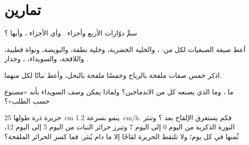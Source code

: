\section{تمارين}

\begin{exercise}[$\star$]\label{exo:b2:angiosperm-reproduction:1}
سمِّ دوّارات  الأربع وأجزاء  . وأي الأجزاء  ، وأيها  ؟
\end{exercise}

\begin{exercise}[$\star$]\label{exo:b2:angiosperm-reproduction:2}
أعط صيغة الصبغيات لكل من: ، والخلية الخضرية، وخلية نطفة،
والبويضة، ونواة قطبية، واللاقحة، والسويداء، ، وجدار
.
\end{exercise}

\begin{exercise}[$\star$]\label{exo:b2:angiosperm-reproduction:3}
اذكر خمس صفات  ملقحة بالرياح وخمسًا  ملقحة بالنحل، وأعط
نباتًا لكل منهما.
\end{exercise}

\begin{exercise}[$\star$]\label{exo:b2:angiosperm-reproduction:4}
ما ، وما الذي يصنعه كل من الاندماجين؟ ولماذا يمكن
وصف السويداء بأنه «مصنوع حسب الطلب»؟
\end{exercise}

\begin{exercise}[$\star\star$]\label{exo:b2:angiosperm-reproduction:5}
حريرة ذرة طولها \qty{25}{cm}  ينمو بسرعة
\qty{1.2}{cm/h}. فكم يستغرق الإلقاح بعد ؟
وتنثر النورة الذكرية  من اليوم 0 إلى اليوم 7 وتبرز حرائر
النبات من اليوم 5 إلى اليوم 12، ثُمنها في كل يوم؛ ولا تلتقط
الحريرة لقاحًا إلا ما دام  يُنثر. فما كسر الحرائر الملقحة؟
\end{exercise}

